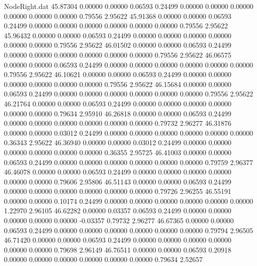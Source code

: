 \begin{filecontents}{NodeRight.dat}
  45.87304    0.00000    0.00000     0.06593    0.24499    0.00000    0.00000    0.00000    0.00000    0.00000    0.00000    0.79556    2.95622
  45.91368    0.00000    0.00000     0.06593    0.24499    0.00000    0.00000    0.00000    0.00000    0.00000    0.00000    0.79556    2.95622
  45.96432    0.00000    0.00000     0.06593    0.24499    0.00000    0.00000    0.00000    0.00000    0.00000    0.00000    0.79556    2.95622
  46.01502    0.00000    0.00000     0.06593    0.24499    0.00000    0.00000    0.00000    0.00000    0.00000    0.00000    0.79556    2.95622
  46.06575    0.00000    0.00000     0.06593    0.24499    0.00000    0.00000    0.00000    0.00000    0.00000    0.00000    0.79556    2.95622
  46.10621    0.00000    0.00000     0.06593    0.24499    0.00000    0.00000    0.00000    0.00000    0.00000    0.00000    0.79556    2.95622
  46.15684    0.00000    0.00000     0.06593    0.24499    0.00000    0.00000    0.00000    0.00000    0.00000    0.00000    0.79556    2.95622
  46.21764    0.00000    0.00000     0.06593    0.24499    0.00000    0.00000    0.00000    0.00000    0.00000    0.00000    0.79634    2.95910
  46.26818    0.00000    0.00000     0.06593    0.24499    0.00000    0.00000    0.00000    0.00000    0.00000    0.00000    0.79732    2.96277
  46.31876    0.00000    0.00000     0.03012    0.24499    0.00000    0.00000    0.00000    0.00000    0.00000    0.00000    0.36343    2.95622
  46.36940    0.00000    0.00000     0.03012    0.24499    0.00000    0.00000    0.00000    0.00000    0.00000    0.00000    0.36355    2.95725
  46.41003    0.00000    0.00000     0.06593    0.24499    0.00000    0.00000    0.00000    0.00000    0.00000    0.00000    0.79759    2.96377
  46.46078    0.00000    0.00000     0.06593    0.24499    0.00000    0.00000    0.00000    0.00000    0.00000    0.00000    0.79606    2.95806
  46.51143    0.00000    0.00000     0.06593    0.24499    0.00000    0.00000    0.00000    0.00000    0.00000    0.00000    0.79726    2.96255
  46.55191    0.00000    0.00000     0.10174    0.24499    0.00000    0.00000    0.00000    0.00000    0.00000    0.00000    1.22970    2.96105
  46.62282    0.00000    0.03357     0.06593    0.24499    0.00000    0.00000    0.00000    0.00000    0.00000   -0.03357    0.79732    2.96277
  46.67365    0.00000    0.00000     0.06593    0.24499    0.00000    0.00000    0.00000    0.00000    0.00000    0.00000    0.79794    2.96505
  46.71420    0.00000    0.00000     0.06593    0.24499    0.00000    0.00000    0.00000    0.00000    0.00000    0.00000    0.79698    2.96149
  46.76511    0.00000    0.00000     0.06593    0.20918    0.00000    0.00000    0.00000    0.00000    0.00000    0.00000    0.79634    2.52657

\end{filecontents}
